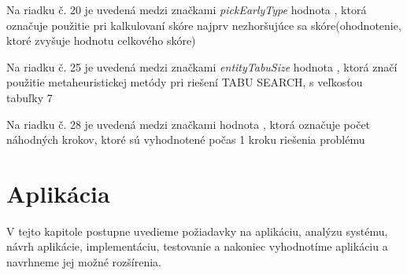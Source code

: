 \item Na riadku č. 20 je uvedená medzi značkami \emph{pickEarlyType} hodnota , ktorá označuje použitie pri kalkulovaní skóre najprv nezhoršujúce sa skóre(ohodnotenie, ktoré zvyšuje hodnotu celkového skóre)
\item Na riadku č. 25 je uvedená medzi značkami \emph{entityTabuSize} hodnota , ktorá značí použitie metaheuristickej metódy pri riešení TABU SEARCH\cite{algibook}, s veľkosťou tabuľky 7
\item Na riadku č. 28 je uvedená medzi značkami  hodnota , ktorá označuje počet náhodných krokov, ktoré sú vyhodnotené počas 1 kroku riešenia problému



\newpage


\chapter{Aplikácia}\label{impl}
V tejto kapitole postupne uvedieme požiadavky na aplikáciu, analýzu systému, návrh aplikácie, implementáciu, testovanie a nakoniec vyhodnotíme aplikáciu a navrhneme jej možné rozšírenia.

